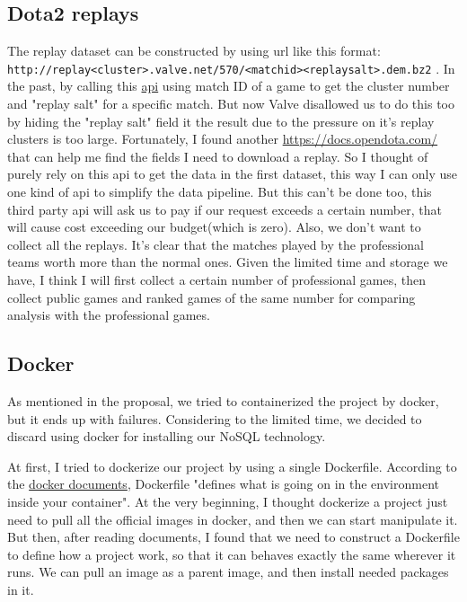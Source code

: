 \documentclass{article}
\newcommand{\codeinline}[1]{
    \texttt{#1}
}
\begin{document}
\subsection{Dota2 replays}
The replay dataset can be constructed by using url like this format: \\
\codeinline{http://replay<cluster>.valve.net/570/<matchid><replaysalt>.dem.bz2}. In the past, by calling this \href{https://wiki.teamfortress.com/wiki/WebAPI/GetMatchDetails}{api} using match ID of a game to get the cluster number and "replay salt" for a specific match. But now Valve disallowed us to do this too by hiding the "replay salt" field it the result due to the pressure on it's replay clusters is too large. Fortunately, I found another \href{third-party api}{https://docs.opendota.com/} that can help me find the fields I need to download a replay. So I thought of purely rely on this api to get the data in the first dataset, this way I can only use one kind of api to simplify the data pipeline. But this can't be done too, this third party api will ask us to pay if our request exceeds a certain number, that will cause cost exceeding our budget(which is zero). Also, we don't want to collect all the replays. It's clear that the matches played by the professional teams worth more than the normal ones. Given the limited time and storage we have, I think I will first collect a certain number of professional games, then collect public games and ranked games of the same number for comparing analysis with the professional games.

\subsection{Docker}

As mentioned in the proposal, we tried to containerized the project by docker, but it ends up with failures. Considering to the limited time, we decided to discard using docker for installing our NoSQL technology.

At first, I tried to dockerize our project by using a single Dockerfile. According to the \href{https://docs.docker.com/}{docker documents}, Dockerfile "defines what is going on in the environment inside your container". At the very beginning, I thought dockerize a project just need to pull all the official images in docker, and then we can start manipulate it. But then, after reading documents, I found that we need to construct a Dockerfile to define how a project work, so that it can behaves exactly the same wherever it runs. We can pull an image as a parent image, and then install needed packages in it.
\end{document}
